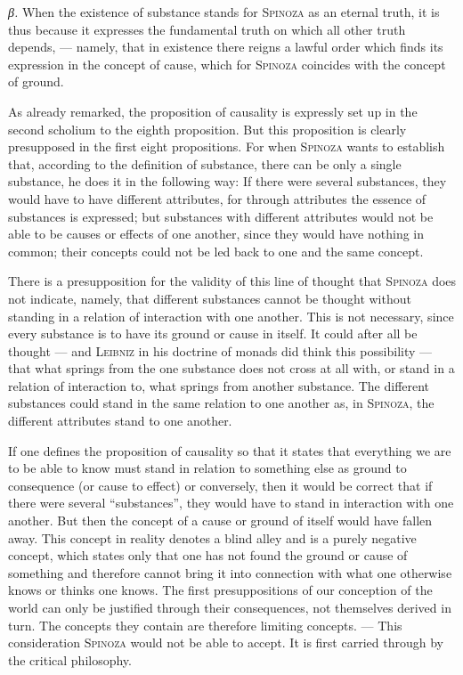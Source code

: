 \documentclass[12pt]{article}
\newcommand{\opage}[1]{\marginnote{\footnotesize\textit{[#1]}}}
\begin{document}
\textit{β.} When the existence of substance stands for \textsc{Spinoza} as an eternal
truth, it is thus because it expresses the fundamental truth on which all other truth
depends, --- namely, that in existence there reigns a lawful order which finds its
expression in the concept of cause, which for \textsc{Spinoza} coincides with the
concept of ground.

As already remarked, the proposition of causality is expressly set up in the second
scholium to the eighth proposition. But this proposition is clearly presupposed in the
first eight propositions. For when \textsc{Spinoza} wants to establish that, according
to the definition of substance, there \opage{20}can be only a single substance, he
does it in the following way: If there were several substances, they would have to have
different attributes, for through attributes the essence of substances is expressed;
but substances with different attributes would not be able to be causes or effects of
one another, since they would have nothing in common; their concepts could not be led
back to one and the same concept.

There is a presupposition for the validity of this line of thought that
\textsc{Spinoza} does not indicate, namely, that different substances cannot be thought
without standing in a relation of interaction with one another. This is not necessary,
since every substance is to have its ground or cause in itself. It could after all be
thought --- and \textsc{Leibniz} in his doctrine of monads did think this possibility
--- that what springs from the one substance does not cross at all with, or stand in a
relation of interaction to, what springs from another substance. The different
substances could stand in the same relation to one another as, in \textsc{Spinoza},
the different attributes stand to one another.

If one defines the proposition of causality so that it states that everything we are
to be able to know must stand in relation to something else as ground to consequence
(or cause to effect) or conversely, then it would be correct that if there were several
``substances'', they would have to stand in interaction with one another. But then the
concept of a cause or ground of itself would have fallen away. This concept in reality
denotes a blind alley and is a purely negative concept, which states only that one has
not found the ground or cause of something and therefore cannot bring it into
connection with what one otherwise knows or thinks one knows. The first presuppositions
of our conception of the world can only be justified through their consequences, not
themselves derived in turn. The concepts they contain are therefore limiting concepts.
--- This consideration \textsc{Spinoza} would not be able to accept. It is first
carried through by the critical philosophy.
\end{document}
